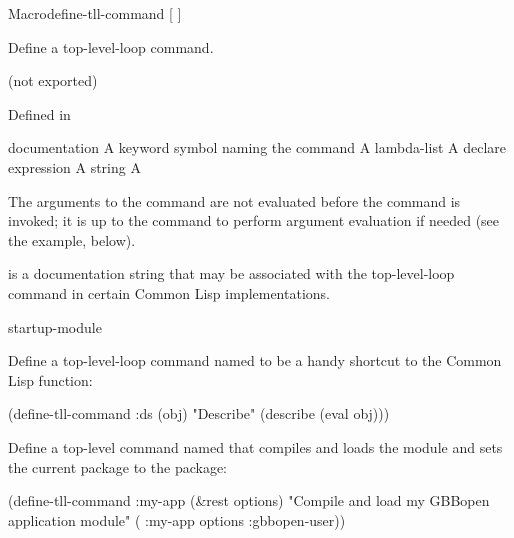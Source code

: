\documentclass[10pt,twoside,english,pdftex]{article}
\begin{document}

\begin{functiondoc}{Macro}{define-tll-command}{ [\superstar{} \vbar{}
     ] \superstar}
%
%
%
  
\fnsyntax

\fnpurpose Define a top-level-loop command.

\fnpackage {} (not exported)

\fnmodule Defined in 

\fnargs
\begin{args}{documentation}
 A keyword symbol naming the command
 A lambda-list
\arg[declaration] A declare expression
\arg[documentation] A string
\arg[form] A 
\end{args}

\fndescription 
The arguments to the command are not evaluated before the command is
invoked; it is up to the command to perform argument evaluation if
needed (see the example, below).

 is a documentation string that may be associated
with the top-level-loop command  in certain Common
Lisp implementations.

\begin{alsos}{startup-module}
\end{alsos}

\fnexamples
Define a top-level-loop command named  to be a handy
shortcut to the Common Lisp  function:
\begin{example}
  (define-tll-command :ds (obj)
    "Describe"
    (describe (eval obj)))
\end{example}

Define a top-level command named  that compiles
and loads the module  and sets the current package
to the  package:
\begin{example}
  (define-tll-command :my-app (&rest options)
    "Compile and load my GBBopen application module"
    ( :my-app options :gbbopen-user))
\end{example} 

\end{functiondoc}
\end{document}
